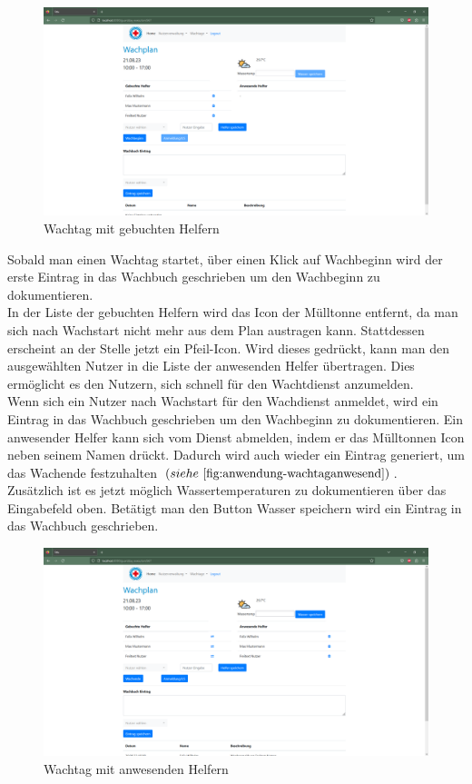 \documentclass[fontsize=12pt,openright,oneside,paper=a4,BCOR=1cm]{scrbook}
\begin{document}
\begin{figure}[H]
  \centering
    \includegraphics[width=0.7\linewidth]{Anlagen/Anwendung/8-1WachtagNutzerGebucht.png}
    \caption{Wachtag mit gebuchten Helfern}
  \label{fig:anwendung-wachtaggebucht}
\end{figure}

Sobald man einen Wachtag startet, \"uber einen Klick auf \glqq Wachbeginn\grqq{} wird der erste Eintrag in das Wachbuch geschrieben um den Wachbeginn zu dokumentieren. \\
In der Liste der gebuchten Helfern wird das Icon der M\"ulltonne entfernt, da man sich nach Wachstart nicht mehr aus dem Plan austragen kann. Stattdessen erscheint an der Stelle jetzt ein Pfeil-Icon. Wird dieses gedr\"uckt, kann man den ausgew\"ahlten Nutzer in die Liste der anwesenden Helfer \"ubertragen. Dies erm\"oglicht es den Nutzern, sich schnell f\"ur den Wachtdienst anzumelden. \\
Wenn sich ein Nutzer nach Wachstart f\"ur den Wachdienst anmeldet, wird ein Eintrag in das Wachbuch geschrieben um den Wachbeginn zu dokumentieren. Ein anwesender Helfer kann sich vom Dienst abmelden, indem er das M\"ulltonnen Icon neben seinem Namen dr\"uckt. Dadurch wird auch wieder ein Eintrag generiert, um das Wachende festzuhalten $(siehe~\ref{fig:anwendung-wachtaganwesend})$. \\
Zus\"atzlich ist es jetzt m\"oglich Wassertemperaturen zu dokumentieren \"uber das Eingabefeld oben. Bet\"atigt man den Button \glqq Wasser speichern\grqq{} wird ein Eintrag in das Wachbuch geschrieben. \\

\begin{figure}[H]
  \centering
    \includegraphics[width=0.7\linewidth]{Anlagen/Anwendung/8-3WachtagAnwesendeNutzer.png}
    \caption{Wachtag mit anwesenden Helfern}
  \label{fig:anwendung-wachtaganwesend}
\end{figure}
\end{document}
